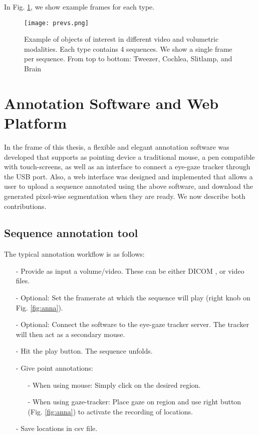 In Fig. \ref{fig:dset_previews}, we show example frames for each type.

\begin{figure}
\centering
\texttt{[image: prevs.png]}
\caption{Example of objects of interest in different video and volumetric modalities. Each type contains 4 sequences. We show a single frame per sequence.
  From top to bottom: Tweezer, Cochlea, Slitlamp, and Brain}
\label{fig:dset_previews}
\end{figure}

\section{Annotation Software and Web Platform}
In the frame of this thesis, a flexible and elegant annotation software was developed that supports as pointing device a traditional mouse, a pen compatible with touch-screens, as well as an interface to connect a eye-gaze tracker through the USB port.
Also, a web interface was designed and implemented that allows a user to upload a sequence annotated using the above software, and download the generated pixel-wise segmentation when they are ready.
We now describe both contributions.

\subsection{Sequence annotation tool}
\label{sec:anna}

The typical annotation workflow is as follows:

\begin{enumerate}
  \item[-]{Provide as input a volume/video. These can be either DICOM \cite{dicom}, or video files.}
  \item[-]{Optional: Set the framerate at which the sequence will play (right knob on Fig. \ref{fig:anna}).}
  \item[-]{Optional: Connect the software to the eye-gaze tracker server. The tracker will then act as a secondary mouse.}
  \item[-]{Hit the play button. The sequence unfolds.}
  \item[-]{Give point annotations:}
    \begin{itemize}
      \item[-]{When using mouse: Simply click on the desired region.}
      \item[-]{When using gaze-tracker: Place gaze on region and use right button (Fig. \ref{fig:anna}) to activate the recording of locations.}
    \end{itemize}
  \item[-]{Save locations in \gls{csv} file.}
\end{enumerate}

